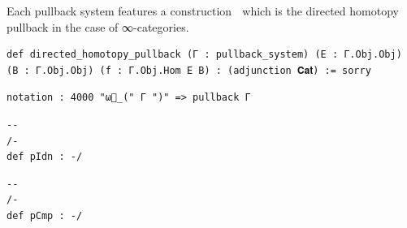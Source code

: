 \documentclass{book}
\theoremstyle{definition}
\newcounter{lcounter}
\begin{document}
 Each pullback system features a construction ω⃗ which is the directed homotopy pullback in the case of ∞-categories.\\
\begin{center} \begin{tcolorbox}[width=5in,colback={white},title={\begin{center}\texttt{Lean \thelcounter} \addtocounter{lcounter}{1} \end{center}},colbacktitle=Blue,coltitle=black] \begin{verbatim}
def directed_homotopy_pullback (Γ : pullback_system) (E : Γ.Obj.Obj) (B : Γ.Obj.Obj) (f : Γ.Obj.Hom E B) : (adjunction 𝐂𝐚𝐭) := sorry
\end{verbatim} \end{tcolorbox} \end{center}
\begin{center} \begin{tcolorbox}[width=5in,colback={white},title={\begin{center}\texttt{Lean \thelcounter} \addtocounter{lcounter}{1} \end{center}},colbacktitle=Blue,coltitle=black] \begin{verbatim}
notation : 4000 "ω⃗_(" Γ ")" => pullback Γ
\end{verbatim} \end{tcolorbox} \end{center}
\begin{center} \begin{tcolorbox}[width=5in,colback={white},title={\begin{center}\texttt{Lean \thelcounter} \addtocounter{lcounter}{1} \end{center}},colbacktitle=Blue,coltitle=black] \begin{verbatim}
--
/-
def pIdn : -/
\end{verbatim} \end{tcolorbox} \end{center}

\begin{center} \begin{tcolorbox}[width=5in,colback={white},title={\begin{center}\texttt{Lean \thelcounter} \addtocounter{lcounter}{1} \end{center}},colbacktitle=Blue,coltitle=black] \begin{verbatim}
--
/-
def pCmp : -/
\end{verbatim} \end{tcolorbox} \end{center}
\end{document}

